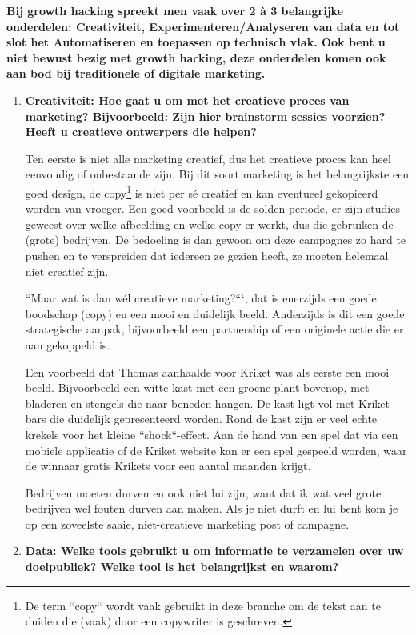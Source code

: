 \textbf{Bij growth hacking spreekt men vaak over 2 à 3 belangrijke onderdelen: Creativiteit, Experimenteren/Analyseren van data en tot slot het Automatiseren en toepassen op technisch vlak. Ook bent u niet bewust bezig met growth hacking, deze onderdelen komen ook aan bod bij traditionele of digitale marketing.}
\begin{enumerate}[label*=\arabic*.]
	\item \textbf{Creativiteit: Hoe gaat u om met het creatieve proces van marketing? Bijvoorbeeld: Zijn hier brainstorm sessies voorzien? Heeft u creatieve ontwerpers die helpen?}
	
	Ten eerste is niet alle marketing creatief, dus het creatieve proces kan heel eenvoudig of onbestaande zijn. Bij dit soort marketing is het belangrijkste een goed design, de copy\footnote{De term ``copy`` wordt vaak gebruikt in deze branche om de tekst aan te duiden die (vaak) door een copywriter is geschreven.} is niet per sé creatief en kan eventueel gekopieerd worden van vroeger. Een goed voorbeeld is de solden periode, er zijn studies geweest over welke afbeelding en welke copy er werkt, dus die gebruiken de (grote) bedrijven. De bedoeling is dan gewoon om deze campagnes zo hard te pushen en te verspreiden dat iedereen ze gezien heeft, ze moeten helemaal niet creatief zijn.
	
	``Maar wat is dan wél creatieve marketing?```, dat is enerzijds een goede boodschap (copy) en een mooi en duidelijk beeld. Anderzijds is dit een goede strategische aanpak, bijvoorbeeld een partnership of een originele actie die er aan gekoppeld is.
	
	Een voorbeeld dat Thomas aanhaalde voor Kriket was als eerste een mooi beeld. Bijvoorbeeld een witte kast met een groene plant bovenop, met bladeren en stengels die naar beneden hangen. De kast ligt vol met Kriket bars die duidelijk gepresenteerd worden. Rond de kast zijn er veel echte krekels voor het kleine ``shock``-effect. Aan de hand van een spel dat via een mobiele applicatie of de Kriket website kan er een spel gespeeld worden, waar de winnaar gratis Krikets voor een aantal maanden krijgt.
	
	Bedrijven moeten durven en ook niet lui zijn, want dat ik wat veel grote bedrijven wel fouten durven aan maken. Als je niet durft en lui bent kom je op een zoveelste saaie, niet-creatieve marketing post of campagne.
	
	\item \textbf{Data: Welke tools gebruikt u om informatie te verzamelen over uw doelpubliek? Welke tool is het belangrijkst en waarom?}
	

\end{enumerate}
